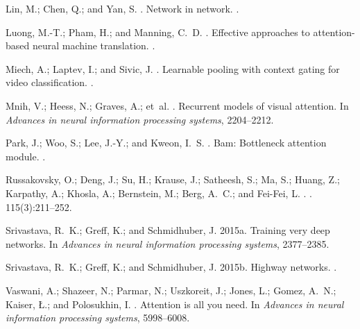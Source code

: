 \documentclass[letterpaper]{article} \usepackage{aaai20}  \usepackage{times}  \usepackage{helvet} \usepackage{courier}  \usepackage[hyphens]{url}  \usepackage{graphicx} \urlstyle{rm} \def\UrlFont{\rm}  \usepackage{graphicx}  \frenchspacing  \setlength{\pdfpagewidth}{8.5in}  \setlength{\pdfpageheight}{11in}  \usepackage{color}
\begin{document}
\begin{thebibliography}{}
	Lin, M.; Chen, Q.; and Yan, S.
	.
	\newblock Network in network.
	.
	
	Luong, M.-T.; Pham, H.; and Manning, C.~D.
	.
	\newblock Effective approaches to attention-based neural machine translation.
	.
	
	Miech, A.; Laptev, I.; and Sivic, J.
	.
	\newblock Learnable pooling with context gating for video classification.
	.
	
	Mnih, V.; Heess, N.; Graves, A.; et~al.
	.
	\newblock Recurrent models of visual attention.
	\newblock In {\em Advances in neural information processing systems},
	2204--2212.
	
	Park, J.; Woo, S.; Lee, J.-Y.; and Kweon, I.~S.
	.
	\newblock Bam: Bottleneck attention module.
	.
	
	Russakovsky, O.; Deng, J.; Su, H.; Krause, J.; Satheesh, S.; Ma, S.; Huang, Z.;
	Karpathy, A.; Khosla, A.; Bernstein, M.; Berg, A.~C.; and Fei-Fei, L.
	.
	.
	115(3):211--252.
	
	Srivastava, R.~K.; Greff, K.; and Schmidhuber, J.
	\newblock 2015a.
	\newblock Training very deep networks.
	\newblock In {\em Advances in neural information processing systems},
	2377--2385.
	
	Srivastava, R.~K.; Greff, K.; and Schmidhuber, J.
	\newblock 2015b.
	\newblock Highway networks.
	.
	
	Vaswani, A.; Shazeer, N.; Parmar, N.; Uszkoreit, J.; Jones, L.; Gomez, A.~N.;
	Kaiser, {\L}.; and Polosukhin, I.
	.
	\newblock Attention is all you need.
	\newblock In {\em Advances in neural information processing systems},
	5998--6008.
	

\end{thebibliography}
\end{document}
